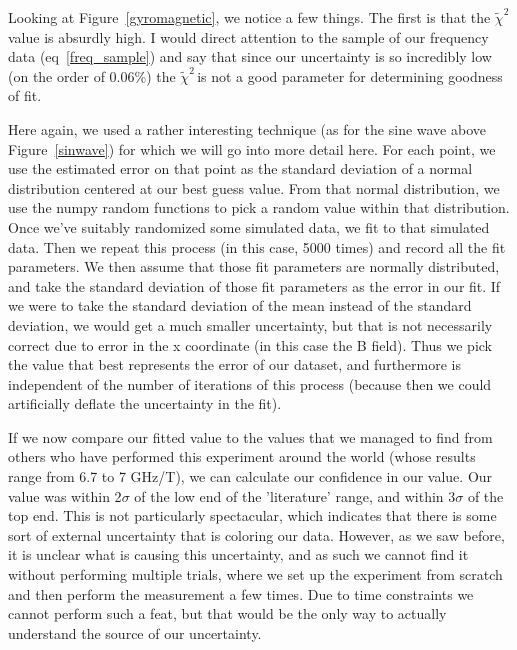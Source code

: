 \documentclass{article}
\newcommand{\redchi}{$\tilde{\chi}^2\,$}
\begin{document}
    Looking at Figure~\ref{gyromagnetic}, we notice a few things.  The first is that the \redchi value is absurdly high.  I would direct attention to the sample of our frequency data (eq~\ref{freq_sample}) and say that since our uncertainty is so incredibly low (on the order of 0.06\%) the \redchi is not a good parameter for determining goodness of fit.

    \hspace{.25cm}

    Here again, we used a rather interesting technique (as for the sine wave above Figure~\ref{sinwave}) for which we will go into more detail here.  For each point, we use the estimated error on that point as the standard deviation of a normal distribution centered at our best guess value.  From that normal distribution, we use the numpy random functions to pick a random value within that distribution.  Once we've suitably randomized some simulated data, we fit to that simulated data.  Then we repeat this process (in this case, 5000 times) and record all the fit parameters.  We then assume that those fit parameters are normally distributed, and take the standard deviation of those fit parameters as the error in our fit.  If we were to take the standard deviation of the mean instead of the standard deviation, we would get a much smaller uncertainty, but that is not necessarily correct due to error in the x coordinate (in this case the B field).  Thus we pick the value that best represents the error of our dataset, and furthermore is independent of the number of iterations of this process (because then we could artificially deflate the uncertainty in the fit).

    \hspace{.25cm}

    If we now compare our fitted value to the values that we managed to find from others who have performed this experiment around the world (whose results range from 6.7 to 7 GHz/T), we can calculate our confidence in our value.  Our value was within 2$\sigma$ of the low end of the 'literature' range, and within 3$\sigma$ of the top end.  This is not particularly spectacular, which indicates that there is some sort of external uncertainty that is coloring our data.  However, as we saw before, it is unclear what is causing this uncertainty, and as such we cannot find it without performing multiple trials, where we set up the experiment from scratch and then perform the measurement a few times.  Due to time constraints we cannot perform such a feat, but that would be the only way to actually understand the source of our uncertainty.
\end{document}
